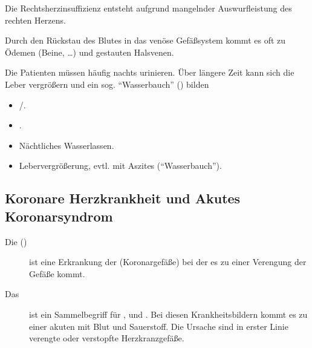Die Rechtsherzinsuffizienz entsteht aufgrund mangelnder Auswurfleistung
des rechten Herzens.

{%
Durch den Rückstau des Blutes in das venöse Gefäßsystem
kommt es oft zu Ödemen (Beine, \ldots) und
gestauten Halsvenen. 

Die Patienten müssen häufig nachts urinieren. Über
längere Zeit kann sich die Leber vergrößern und ein sog.
"`Wasserbauch"' () bilden 
}{
\begin{itemize}
  \item {}/.
  \item {}.
  \item Nächtliches Wasserlassen.
  \item Lebervergrößerung, evtl. mit Aszites
  ("`Wasserbauch"').
\end{itemize}
}{}{}{}







\clearpage
\subsection{Koronare Herzkrankheit und Akutes Koronarsyndrom}


\begin{description}
  \item[Die 
  ()] ist eine Erkrankung der
   (Koronargefäße)
  bei der es zu einer Verengung der Gefäße kommt.
  \item[Das ] ist ein
  Sammelbegriff für ,  und .
  Bei diesen Krankheitsbildern kommt es zu einer akuten
   mit Blut und
  Sauerstoff. Die Ursache sind in erster Linie verengte oder verstopfte
  Herzkranzgefäße.
\end{description}

